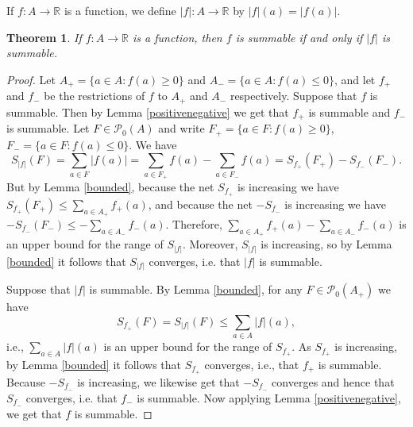 \documentclass{article}
\newtheorem{theorem}{Theorem}
\begin{document}
If $f:A \to \mathbb{R}$ is a function, we define $|f|:A \to \mathbb{R}$ by $|f|(a)=|f(a)|$.

\begin{theorem}
If $f:A \to \mathbb{R}$ is a function, then $f$ is summable if and only if $|f|$ is summable.
\label{absolute}
\end{theorem}
\begin{proof}
Let $A_+=\{a \in A: f(a) \geq 0\}$ and $A_-=\{a \in A: f(a) \leq 0\}$, and let $f_+$ and $f_-$ be the restrictions of $f$ to $A_+$ and $A_-$
respectively. 
Suppose that $f$ is summable. Then by Lemma \ref{positivenegative} we get that $f_+$ is summable and $f_-$ is summable. 
Let $F \in \mathscr{P}_0(A)$ and write $F_+=\{a \in F: f(a) \geq 0\}$, $F_-=\{a \in F: f(a) \leq 0\}$. We have
\[
S_{|f|}(F) = \sum_{a \in F} |f(a)| = \sum_{a \in F_+} f(a) - \sum_{a \in F_-} f(a) = S_{f_+}(F_+) - S_{f_-}(F_-).
\]
But
by  Lemma \ref{bounded}, because the net $S_{f_+}$ is increasing we have
$S_{f_+}(F_+) \leq \sum_{a \in A_+} f_+(a)$, and because the net $-S_{f_-}$ is increasing we have
$-S_{f_-}(F_-) \leq - \sum_{a \in A_-}f_-(a)$.
Therefore, $ \sum_{a \in A_+} f_+(a)- \sum_{a \in A_-}f_-(a)$ is an upper bound for the range of $S_{|f|}$. 
Moreover, $S_{|f|}$ is increasing, so by Lemma \ref{bounded} it follows that $S_{|f|}$ converges, i.e. that $|f|$ is summable.

Suppose that $|f|$ is summable. By Lemma \ref{bounded}, for any $F \in \mathscr{P}_0(A_+)$ we have
\[
S_{f_+}(F) = S_{|f|}(F) \leq \sum_{a \in A} |f|(a),
\]
i.e., $\sum_{a \in A} |f|(a)$ is an upper bound for the range of $S_{f_+}$. As $S_{f_+}$ is increasing, by Lemma \ref{bounded} it follows
that $S_{f_+}$ converges, i.e., that $f_+$ is summable. Because $-S_{f_-}$ is increasing, we likewise get that $-S_{f_-}$ converges and hence
that $S_{f_-}$ converges, i.e. that $f_-$ is summable. Now applying Lemma \ref{positivenegative}, we get that $f$ is summable.
\end{proof}
\end{document}
